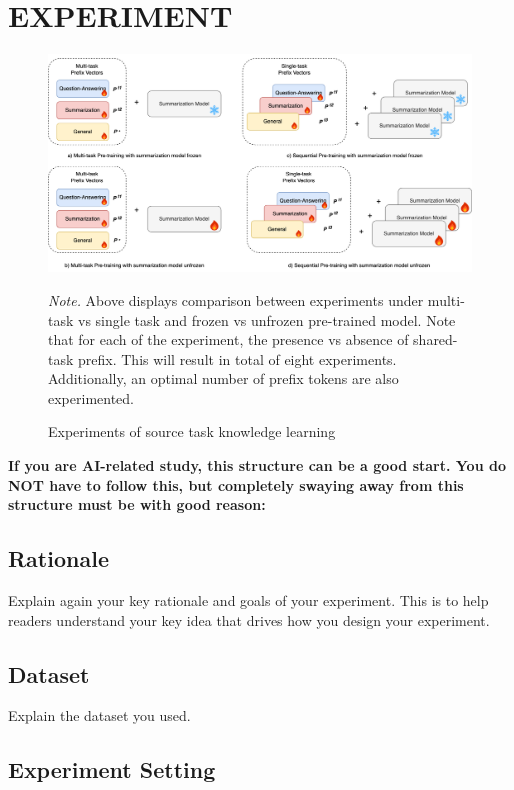 \setlength{\footskip}{8mm}

\chapter{EXPERIMENT}

\begin{figure}[hbt!]
\caption{Experiments of source task knowledge learning}
\centerline{\includegraphics[width=15cm]{figures/phase1.png}}
\label{fig:phase1}
\small{\textit{Note.} Above displays comparison between experiments under multi-task vs single task and frozen vs unfrozen pre-trained model. Note that for each of the experiment, the presence vs absence of shared-task prefix. This will result in total of eight experiments. Additionally, an optimal number of prefix tokens are also experimented.}
\end{figure}

\textbf{If you are AI-related study,  this structure can be a good start.   You do NOT have to follow this, but completely swaying away from this structure must be with good reason:
}

\section{Rationale}
Explain again your key rationale and goals of your experiment.  This is to help readers understand your key idea that drives how you design your experiment.

\section{Dataset}
Explain the dataset you used.

\section{Experiment Setting}

